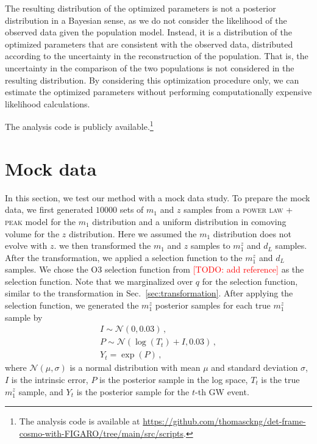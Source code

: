 \documentclass[aps,prd,twocolumn,superscriptaddress,preprintnumbers,nofootinbib,hidelinks]{revtex4-2}
\newcommand{\todo}[1]{\textcolor{red}{[TODO: #1]}}
\begin{document}
The resulting distribution of the optimized parameters is not a posterior distribution in a Bayesian sense, as we do not consider the likelihood of the observed data given the population model.
Instead, it is a distribution of the optimized parameters that are consistent with the observed data, distributed according to the uncertainty in the reconstruction of the population.
That is, the uncertainty in the comparison of the two populations is not considered in the resulting distribution.
By considering this optimization procedure only, we can estimate the optimized parameters without performing computationally expensive likelihood calculations.

The analysis code is publicly available.\footnote{The analysis code is available at \url{https://github.com/thomasckng/det-frame-cosmo-with-FIGARO/tree/main/src/scripts}.}

\section{Mock data}
\label{sec:mock_data}

In this section, we test our method with a mock data study.
To prepare the mock data, we first generated $10000$ sets of $m_1$ and $z$ samples from a \textsc{power law + peak} model for the $m_1$ distribution and a uniform distribution in comoving volume for the $z$ distribution.
Here we assumed the $m_1$ distribution does not evolve with $z$.
we then transformed the $m_1$ and $z$ samples to $m^z_1$ and $d_L$ samples.
After the transformation, we applied a selection function to the $m^z_1$ and $d_L$ samples.
We chose the O3 selection function from \todo{add reference} as the selection function.
Note that we marginalized over $q$ for the selection function, similar to the transformation in Sec.~\ref{sec:transformation}.
After applying the selection function, we generated the $m^z_1$ posterior samples for each true $m^z_1$ sample by
\begin{gather*}
    I \sim \mathcal{N}(0, 0.03)\,,\\
    P \sim \mathcal{N}(\log(T_t)+I, 0.03)\,,\\
    Y_t = \exp(P)\,,
\end{gather*}
where $\mathcal{N}(\mu, \sigma)$ is a normal distribution with mean $\mu$ and standard deviation $\sigma$, $I$ is the intrinsic error, $P$ is the posterior sample in the log space, $T_t$ is the true $m^z_1$ sample, and $Y_t$ is the posterior sample for the $t$-th \ac{GW} event.
\end{document}
